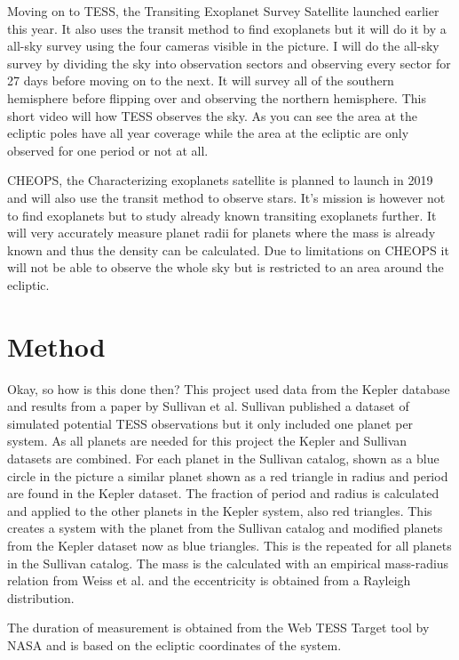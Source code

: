 \documentclass[12pt]{report}
\begin{document}
	Moving on to TESS, the Transiting Exoplanet Survey Satellite launched earlier this year. It also uses the transit method to find exoplanets but it will do it by a all-sky survey using the four cameras visible in the picture. I will do the all-sky survey by dividing the sky into observation sectors and observing every sector for 27 days before moving on to the next. It will survey all of the southern hemisphere before flipping over and observing the northern hemisphere. This short video will how TESS observes the sky. As you can see the area at the ecliptic poles have all year coverage while the area at the ecliptic are only observed for one period or not at all.
	
	CHEOPS, the Characterizing exoplanets satellite is planned to launch in 2019 and will also use the transit method to observe stars. It's mission is however not to find exoplanets but to study already known transiting exoplanets further. It will very accurately measure planet radii for planets where the mass is already known and thus the density can be calculated. Due to limitations on CHEOPS it will not be able to observe the whole sky but is restricted to an area around the ecliptic.
	
\section*{Method}
	Okay, so how is this done then? This project used data from the Kepler database and results from a paper by Sullivan et al. Sullivan published a dataset of simulated potential TESS observations but it only included one planet per system. As all planets are needed for this project the Kepler and Sullivan datasets are combined. For each planet in the Sullivan catalog, shown as a blue circle in the picture a similar planet shown as a red triangle in radius and period are found in the Kepler dataset. The fraction of period and radius is calculated and applied to the other planets in the Kepler system, also red triangles. This creates a system with the planet from the Sullivan catalog and modified planets from the Kepler dataset now as blue triangles. This is the repeated for all planets in the Sullivan catalog. The mass is the calculated with an empirical mass-radius relation from Weiss et al. and the eccentricity is obtained from a Rayleigh distribution. 
	
	The duration of measurement is obtained from the Web TESS Target tool by NASA and is based on the ecliptic coordinates of the system. 
	
\end{document}
